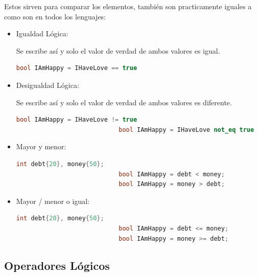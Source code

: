 \documentclass[12pt, fleqn]{report}                             %
\theoremstyle{break}                                            %
\begin{document}
                Estos sirven para comparar los elementos, también son practicamente iguales a como son en todos los
                lenguajes:
                \begin{itemize}
                    \item Igualdad Lógica: 
                    
                        Se escribe así y solo el valor de verdad de ambos valores es igual.
                        \begin{lstlisting}[language=C++, gobble=28]
                            bool IAmHappy = IHaveLove == true
                        \end{lstlisting}
                    
                    \item Desigualdad Lógica: 
                    
                        Se escribe así y solo el valor de verdad de ambos valores es diferente.
                        \begin{lstlisting}[language=C++, gobble=28]
                            bool IAmHappy = IHaveLove != true
                            bool IAmHappy = IHaveLove not_eq true
                        \end{lstlisting}

                    \item Mayor y menor: 
                        \begin{lstlisting}[language=C++, gobble=28]
                            int debt{20}, money{50};
                            bool IAmHappy = debt < money;
                            bool IAmHappy = money > debt;
                        \end{lstlisting}

                    \item Mayor / menor o igual: 
                        \begin{lstlisting}[language=C++, gobble=28]
                            int debt{20}, money{50};
                            bool IAmHappy = debt <= money;
                            bool IAmHappy = money >= debt;
                        \end{lstlisting}
                \end{itemize}


            \subsection{Operadores Lógicos}
\end{document}
